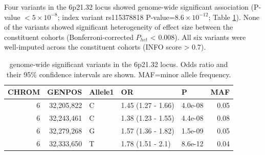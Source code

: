     Four variants in the 6p21.32 locus showed genome-wide significant association (P-value $< 5\times10^{-8}$; index variant rs115378818 P-value=$8.6\times10^{-12}$; Table \ref{table:gws}). None of the variants showed significant heterogeneity of effect size between the constituent cohorts (Bonferroni-corrected $P_{het}$ < 0.008). All six variants were well-imputed across the constituent cohorts (INFO score > 0.7).
  
    \begin{table}[H]
      \caption{genome-wide significant variants in the 6p21.32 locus. Odds ratio and their 95\% confidence intervals are shown. MAF=minor allele frequency.}
      \label{table:gws}
      \centering\begingroup\fontsize{10}{12}\selectfont
      
      \begin{tabular}[t]{|r|r|l|l|l|r|}
      \hline
      CHROM & GENPOS & Allele1 & OR & P & MAF\\
      \hline
      6 & 32,205,822 & C & 1.45 (1.27 - 1.66) & 4.0e-08 & 0.05\\
      \hline
      6 & 32,243,461 & C & 1.38 (1.23 - 1.55) & 4.4e-08 & 0.08\\
      \hline
      6 & 32,279,268 & G & 1.57 (1.36 - 1.82) & 1.5e-09 & 0.05\\
      \hline
      6 & 32,333,650 & T & 1.78 (1.51 - 2.1) & 8.6e-12 & 0.04\\
      \hline
      \end{tabular}
      \endgroup{}
      \end{table}

    
    
